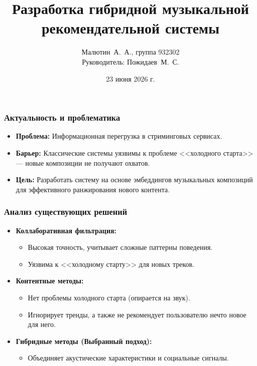 \documentclass{beamer}
\title{Разработка гибридной музыкальной рекомендательной системы}
\author{Малютин~А.~А., группа 932302 \\ Руководитель: Пожидаев~М.~С.}
\institute{НИ ТГУ, Институт прикладной математики и компьютерных наук}
\date{23 июня 2026 г.}
\begin{document}
\begin{frame}
\maketitle
\end{frame}

\begin{frame}
\frametitle{Актуальность и проблематика}
\begin{itemize}
    \item \textbf{Проблема:} Информационная перегрузка в стриминговых сервисах.
    \item \textbf{Барьер:} Классические системы уязвимы к проблеме <<холодного старта>> --- новые композиции не получают охватов.
    \item \textbf{Цель:} Разработать систему на основе эмбеддингов музыкальных композиций для эффективного ранжирования нового контента.
\end{itemize}
\end{frame}

\begin{frame}
\frametitle{Анализ существующих решений}
\begin{itemize}
    \item \textbf{Коллаборативная фильтрация:} 
    \begin{itemize}
        \item[+] Высокая точность, учитывает сложные паттерны поведения.
        \item[-] Уязвима к <<холодному старту>> для новых треков.
    \end{itemize}
    \item \textbf{Контентные методы:}
    \begin{itemize}
        \item[+] Нет проблемы холодного старта (опирается на звук).
        \item[-] Игнорирует тренды, а также не рекомендует пользователю нечто новое для него.
    \end{itemize}
    \item \textbf{Гибридные методы (Выбранный подход):}
    \begin{itemize}
        \item[+] Объединяет акустические характеристики и социальные сигналы.
    \end{itemize}
\end{itemize}
\end{frame}
\end{document}
